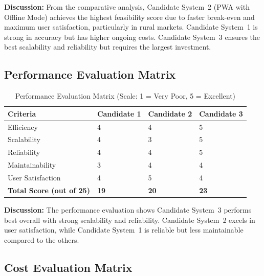 \documentclass[12pt,a4paper,oneside]{book}
\begin{document}
\textbf{Discussion:}
From the comparative analysis, Candidate System~2 (PWA with Offline Mode) achieves the highest feasibility score due to faster break-even and maximum user satisfaction, particularly in rural markets. Candidate System~1 is strong in accuracy but has higher ongoing costs. Candidate System~3 ensures the best scalability and reliability but requires the largest investment.

\subsection{Performance Evaluation Matrix}

\begin{table}[H]
\centering
\caption{Performance Evaluation Matrix (Scale: 1 = Very Poor, 5 = Excellent)}
\footnotesize
\begin{tabular}{|L{3.5cm}|C{2.2cm}|C{2.2cm}|C{2.2cm}|}
\hline
\textbf{Criteria} & \textbf{Candidate 1} & \textbf{Candidate 2} & \textbf{Candidate 3} \\
\hline
Efficiency & 4 & 4 & 5 \\
\hline
Scalability & 4 & 3 & 5 \\
\hline
Reliability & 4 & 4 & 5 \\
\hline
Maintainability & 3 & 4 & 4 \\
\hline
User Satisfaction & 4 & 5 & 4 \\
\hline
\textbf{Total Score (out of 25)} & \textbf{19} & \textbf{20} & \textbf{23} \\
\hline
\end{tabular}
\end{table}

\textbf{Discussion:}
The performance evaluation shows Candidate System~3 performs best overall with strong scalability and reliability. Candidate System~2 excels in user satisfaction, while Candidate System~1 is reliable but less maintainable compared to the others.

\subsection{Cost Evaluation Matrix}
\end{document}
